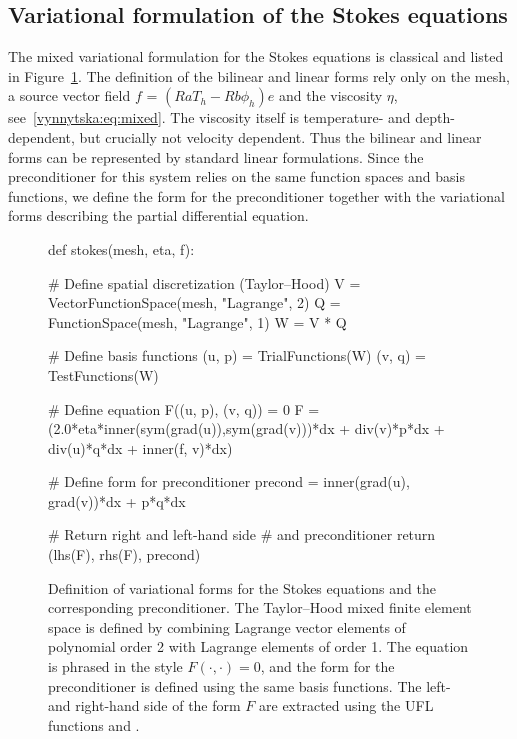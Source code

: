 \subsection{Variational formulation of the Stokes equations}

The mixed variational formulation for the Stokes equations is
classical and listed in Figure~\ref{vynnytska:fig:stokes}. The
definition of the bilinear and linear forms rely only on the mesh, a
source vector field $f$ = $(Ra T_h - Rb \phi_h) e$ and the viscosity
$\eta$, see~\eqref{vynnytska:eq:mixed}.  The viscosity itself is
temperature- and depth-dependent, but crucially not velocity
dependent.  Thus the bilinear and linear forms can be represented by
standard linear formulations.  Since the preconditioner for this
system relies on the same function spaces and basis functions, we
define the form for the preconditioner together with the variational
forms describing the partial differential equation.
\begin{figure}
  \begin{python}
def stokes(mesh, eta, f):

    # Define spatial discretization (Taylor--Hood)
    V = VectorFunctionSpace(mesh, "Lagrange", 2)
    Q = FunctionSpace(mesh, "Lagrange", 1)
    W = V * Q

    # Define basis functions
    (u, p) = TrialFunctions(W)
    (v, q) = TestFunctions(W)

    # Define equation F((u, p), (v, q)) = 0
    F = (2.0*eta*inner(sym(grad(u)),sym(grad(v)))*dx
         + div(v)*p*dx
         + div(u)*q*dx
         + inner(f, v)*dx)

    # Define form for preconditioner
    precond = inner(grad(u), grad(v))*dx + p*q*dx

    # Return right and left-hand side
    # and preconditioner
    return (lhs(F), rhs(F), precond)
  \end{python}

  \caption{Definition of variational forms for the Stokes equations
    and the corresponding preconditioner. The Taylor--Hood mixed
    finite element space is defined by combining Lagrange vector
    elements of polynomial order 2 with Lagrange elements of order
    1. The equation is phrased in the style $F(\cdot, \cdot) = 0$, and
    the form for the preconditioner is defined using the same basis
    functions. The left- and right-hand side of the form $F$ are
    extracted using the UFL functions 
    and .}
  \label{vynnytska:fig:stokes}
\end{figure}

